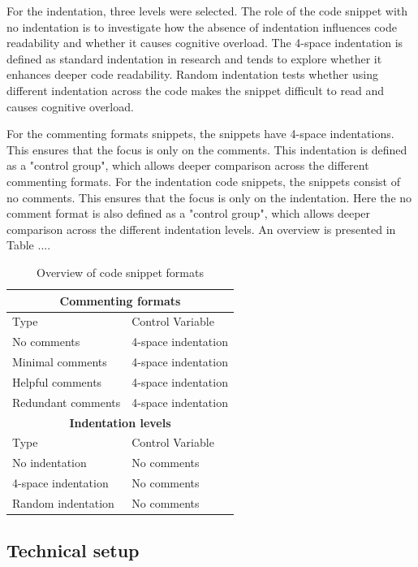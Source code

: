 For the indentation, three levels were selected. 
The role of the code snippet with no indentation is to investigate how the absence of indentation influences code readability and whether it causes cognitive overload.
The 4-space indentation is defined as standard indentation in research and tends to explore whether it enhances deeper code readability.  
Random indentation tests whether using different indentation across the code makes the snippet difficult to read and causes cognitive overload.


For the commenting formats snippets, the snippets have 4-space indentations. This ensures that the focus is only on the comments. This indentation is defined as a "control group", which allows deeper comparison across the different commenting formats. 
For the indentation code snippets, the snippets consist of no comments. This ensures that the focus is only on the indentation. Here the no comment format is also defined as a "control group", which allows deeper comparison across the different indentation levels. An overview is presented in Table ....


\begin{table}[ht]
\centering
\caption{Overview of code snippet formats}
\begin{tabular}{|p{6cm}|p{6cm}|}

\hline
\multicolumn{2}{|c|}{
\textbf{Commenting formats}} \\
\hline
Type & Control Variable \\
\hline 
No comments & 4-space indentation \\
Minimal comments & 4-space indentation \\
Helpful comments & 4-space indentation \\
Redundant comments & 4-space indentation \\
\hline
\multicolumn{2}{|c|}{\textbf{Indentation levels}} \\
\hline
Type & Control Variable \\
\hline
No indentation & No comments \\
4-space indentation & No comments \\
Random indentation & No comments \\
\hline
\end{tabular}
\label{tab:snippet_control}
\end{table}



\subsection{Technical setup}

